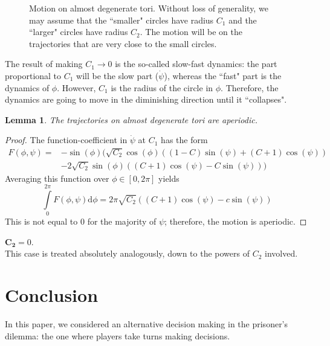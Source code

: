 \documentclass{article}
\newtheorem{lemma}[theorem]{Lemma}
\theoremstyle{definition}
\numberwithin{equation}{section}
\begin{document}
\begin{figure}
\begin{tikzpicture}[x=0.75pt,y=0.75pt,yscale=-1,xscale=1]
\end{tikzpicture}
    \caption{Motion on almost degenerate tori. Without loss of generality, we may assume that the ``smaller" circles have radius $C_1$ and the ``larger" circles have radius $C_2$. The motion will be on the trajectories that are very close to the small circles.}
    \label{fig:placeholder}
\end{figure}
The result of making $C_1\to 0$ is the so-called slow-fast dynamics: the part proportional to $C_1$ will be the slow part ($\dot{\psi}$), whereas the ``fast" part is the dynamics of $\phi$. However, $C_1$ is the radius of the circle in $\phi$. Therefore, the dynamics are going to move in the diminishing direction until it ``collapses". 
\begin{lemma}
    The trajectories on almost degenerate tori are aperiodic.
\end{lemma}
\begin{proof}
    The function-coefficient in $\dot{\psi}$ at $C_1$ has the form 
    \begin{equation*}
        \begin{split}
            F(\phi,\psi) =& -\sin (\phi ) \Big(\sqrt{C_2} \cos (\phi ) ((1-C) \sin (\psi )+(C+1) \cos (\psi ))\\&-2 \sqrt{C_2} \sin (\phi ) ((C+1) \cos (\psi )-C \sin (\psi ))\Big)
        \end{split}
    \end{equation*}
    Averaging this function over $\phi\in[0,2\pi]$ yields
    \[
\int\limits_0^{2\pi}F(\phi,\psi)\mathrm{d}\phi = 2 \pi  \sqrt{C_2} ((C+1) \cos (\psi )-c \sin (\psi ))
    \]
    This is not equal to $0$ for the majority of $\psi$; therefore, the motion is aperiodic. 
\end{proof}
\noindent
$\mathbf{C_2}=0$. \\
\noindent
This case is treated absolutely analogously, down to the powers of $C_2$ involved.  

\section{Conclusion}
In this paper, we considered an alternative decision making in  the prisoner's dilemma: the one where players take turns making decisions. 
\end{document}
